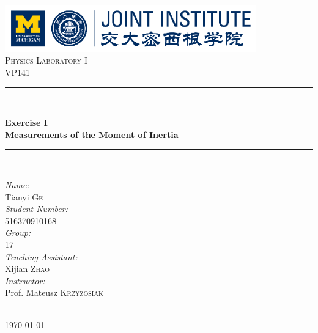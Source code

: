 \begin{titlepage}

\newcommand{\HRule}{\rule{\linewidth}{0.5mm}}

\center

\includegraphics[height=0.8in]{images/logo.png}\\[1cm]

\textsc{\Large Physics Laboratory I}\\[0.4cm]
\textsc{\large VP141}\\[0.4cm]

\HRule \\[0.4cm]
{
    \bfseries
    {\huge Exercise I}\\[0.3cm]
    {\large Measurements of the Moment of Inertia}\\[0.2cm]
    \HRule \\[1.5cm]
}

\begin{minipage}{0.4\textwidth}

\large
\emph{Name:}\\
Tianyi \textsc{Ge} \\

\emph{Student Number:}\\
516370910168 \\

\emph{Group:}\\
17\\

\emph{Teaching Assistant:}\\
Xijian \textsc{Zhao}\\

\emph{Instructor:}\\
Prof. Mateusz \textsc{Krzyzosiak}

\end{minipage}\\[2cm]

{\large \today}\\[2cm]

\vfill

\end{titlepage}